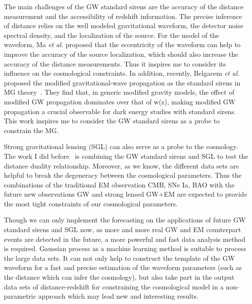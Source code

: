 \documentclass[11pt,letterpaper,sans]{moderncv}   %
\begin{document}
\vspace{2mm}
\noindent
The main challenges of the GW standard sirens are the accuracy of the distance measurement and the accessibility of redshift information. The precise inference of distance relies on the well modeled gravitational waveform, the detector noise spectral density, and the localization of the source. For the model of the waveform, Ma \textit{et al.} proposed that the eccentricity of the waveform can help to improve the accuracy of the source localization, which should also increase the accuracy of the distance measurements. Thus it inspires me to consider its influence on the cosmological constraints.
In addition, recently, Belgacem \textit{et al.} proposed the modified gravitational-wave propagation as the standard sirens in MG theory~\cite{Belgacem:2018lbp}. They find that, in generic modified gravity models, the effect of modified GW propagation dominates over that of w(z), making modified GW propagation a crucial observable for dark energy studies with standard sirens. This work inspires me to consider the GW standard sirens as a probe to constrain the MG.



\vspace{2mm}
\noindent
Strong gravitational lensing (SGL) can also serve as a probe to the cosmology. The work I did before~\cite{Yang:2017bkv} is combining the GW standard sirens and SGL to test the distance duality relationship. Moreover, as we know, the different data sets are helpful to break the degeneracy between the cosmological parameters. Thus the combinations of the traditional EM observation CMB, SNe Ia, BAO with the future new observations GW and strong lensed GW+EM are expected to provide the most tight constraints of our cosmological parameters. 

\vspace{2mm}
\noindent
Though we can only implement the forecasting on the applications of future GW standard sirens and SGL now, as more and more real GW and EM counterpart events 
are detected in the future, a more powerful and fast data analysis method is required. Gaussian process as a machine learning method is suitable to process the large data sets. It can not only help to construct the template of the GW waveform for a fast and precise estimation of the waveform parameters (such as the distance which can infer the cosmology), but also take part in the output data sets of distance-redshift for constraining the cosmological model in a non-parametric approach which may lead new and interesting results.  
\end{document}

